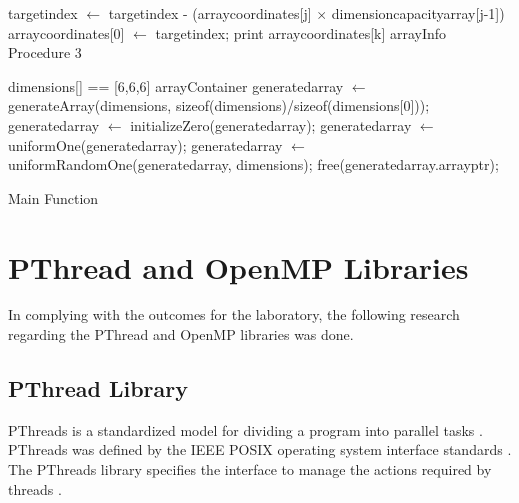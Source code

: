 \documentclass[10pt,twocolumn]{witseiepaper}
\begin{document}
\begin{appendix}
\begin{algorithm}[htbp]
\begin{algorithmic}
		\State target\textunderscore index $\leftarrow$ target\textunderscore index - (array\textunderscore coordinates[j] $\times$ \textunderscore dimension\textunderscore capacity\textunderscore array[j-1])
		\EndIf
		\State array\textunderscore coordinates[0] $\leftarrow$ target\textunderscore index;
		\EndFor
		\State print array\textunderscore coordinates[k]
		\EndFor
		\EndFor
		\State \Return arrayInfo 
		\EndFunction \\
		\caption{Procedure 3}
		\label{alg:3}
	\end{algorithmic}
\end{algorithm}

\begin{algorithm}[htbp]
	\begin{algorithmic}
		\State dimensions[] == [6,6,6]
		\State arrayContainer generated\textunderscore array $\leftarrow$ generateArray(dimensions, sizeof(dimensions)/sizeof(dimensions[0]));
		\State generated\textunderscore array $\leftarrow$ initializeZero(generated\textunderscore array);
		\State generated\textunderscore array $\leftarrow$ uniformOne(generated\textunderscore array);
		\State generated\textunderscore array $\leftarrow$ uniformRandomOne(generated\textunderscore array, dimensions);
		\State free(generated\textunderscore array.array\textunderscore ptr);
		\EndFunction
		\caption{Main Function}
		\label{alg:4}
	\end{algorithmic}
\end{algorithm}

\section{PThread and OpenMP Libraries}
In complying with the outcomes for the laboratory, the following research regarding the PThread and OpenMP libraries was done.

\subsection{PThread Library}
PThreads is a standardized model for dividing a program into parallel tasks \cite{pthreads}. PThreads was defined by the IEEE POSIX operating system interface standards \cite{pthreads}. The PThreads library specifies the interface to manage the actions required by threads \cite{pthreadVSopen}.


\end{appendix}
\end{document}
